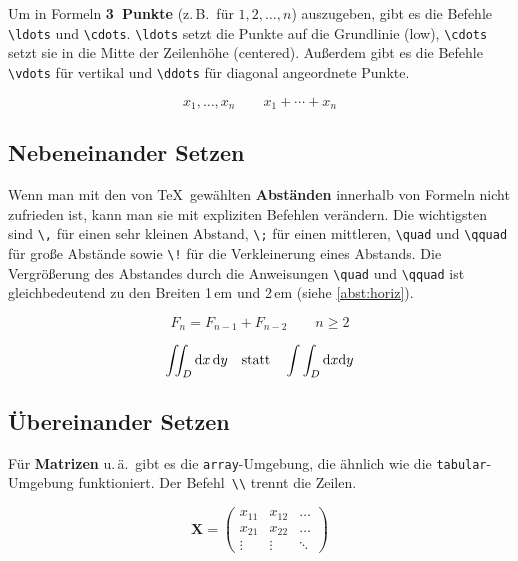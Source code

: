 Um in Formeln \textbf{3~Punkte} (z.\,B.\ für \(1,2,\ldots,n\))
auszugeben, gibt es die Befehle
\lstinline|\ldots| und \lstinline|\cdots|.
\lstinline|\ldots| setzt die Punkte auf die Grundlinie (low),
\lstinline|\cdots| setzt sie in die Mitte der Zeilenhöhe
(centered).
Außerdem gibt es die Befehle
\lstinline|\vdots| für vertikal und
\lstinline|\ddots| für diagonal angeordnete Punkte.

\begin{LTXexample}
\[
x_{1},\ldots,x_{n} \qquad
x_{1}+\cdots+x_{n}
\]
\end{LTXexample}


\subsection{Nebeneinander Setzen}

Wenn man mit den von \TeX\ gewählten \textbf{Abständen}
innerhalb von Formeln nicht zufrieden ist, kann man sie mit
expliziten Befehlen verändern. Die wichtigsten sind
\lstinline|\,| für einen sehr kleinen Abstand,
\lstinline|\;| für einen mittleren,
\lstinline|\quad| und \lstinline|\qquad| für große Abstände sowie
\lstinline|\!| für die Verkleinerung eines Abstands. Die Vergrößerung des Abstandes
durch die Anweisungen \lstinline|\quad| und \lstinline|\qquad| ist gleichbedeutend zu den Breiten 1\,em und 2\,em (siehe \vref{abst:horiz}).

\begin{LTXexample}
\[
F_{n} = F_{n-1} + F_{n-2}
 \qquad n \ge 2
\]
\end{LTXexample}


\begin{LTXexample}
\[
\int\!\!\!\int_{D}
\mathrm{d}x\,\mathrm{d}y
\quad \textnormal{statt} \quad
\int\int_{D}
\mathrm{d}x \mathrm{d}y
\]
\end{LTXexample}



\subsection{Übereinander Setzen}

Für \textbf{Matrizen} u.\,ä.\ gibt es die
\texttt{array}-Umgebung, die ähnlich wie die
\texttt{tabular}-Umgebung funktioniert.
Der Befehl~\lstinline|\\| trennt die Zeilen.

\begin{LTXexample}
\[
\mathbf{X} =
\left( \begin{array}{ccc}
x_{11} & x_{12} & \ldots \\
x_{21} & x_{22} & \ldots \\
\vdots & \vdots & \ddots
\end{array} \right)
\]
\end{LTXexample}


